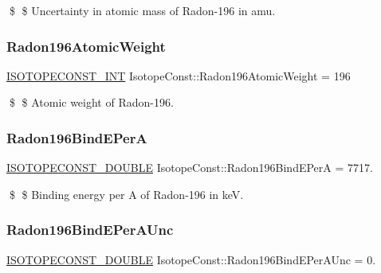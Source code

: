 \$ \$ Uncertainty in atomic mass of Radon-\/196 in amu. \mbox{\label{group___isotope_const-_radon-_rn196_gac7c7065a07e5335adac1ddbc65ab28e4}} 
\subsubsection{\texorpdfstring{Radon196\+Atomic\+Weight}{Radon196AtomicWeight}}
{\footnotesize\ttfamily \mbox{\hyperlink{group___isotope_const-_macros_ga5f18360b3e99483a35c32d789e62621c}{I\+S\+O\+T\+O\+P\+E\+C\+O\+N\+S\+T\+\_\+\+I\+NT}} Isotope\+Const\+::\+Radon196\+Atomic\+Weight = 196}

\$ \$ Atomic weight of Radon-\/196. \mbox{\label{group___isotope_const-_radon-_rn196_gae51a03905cd2f75b504cab231cb8bd69}} 
\subsubsection{\texorpdfstring{Radon196\+Bind\+E\+PerA}{Radon196BindEPerA}}
{\footnotesize\ttfamily \mbox{\hyperlink{group___isotope_const-_macros_ga8f45a7272ce02c0b4c65c44636ed719a}{I\+S\+O\+T\+O\+P\+E\+C\+O\+N\+S\+T\+\_\+\+D\+O\+U\+B\+LE}} Isotope\+Const\+::\+Radon196\+Bind\+E\+PerA = 7717.}

\$ \$ Binding energy per A of Radon-\/196 in keV. \mbox{\label{group___isotope_const-_radon-_rn196_ga9837c1323ec170bb48dcb2bef547d283}} 
\subsubsection{\texorpdfstring{Radon196\+Bind\+E\+Per\+A\+Unc}{Radon196BindEPerAUnc}}
{\footnotesize\ttfamily \mbox{\hyperlink{group___isotope_const-_macros_ga8f45a7272ce02c0b4c65c44636ed719a}{I\+S\+O\+T\+O\+P\+E\+C\+O\+N\+S\+T\+\_\+\+D\+O\+U\+B\+LE}} Isotope\+Const\+::\+Radon196\+Bind\+E\+Per\+A\+Unc = 0.}

